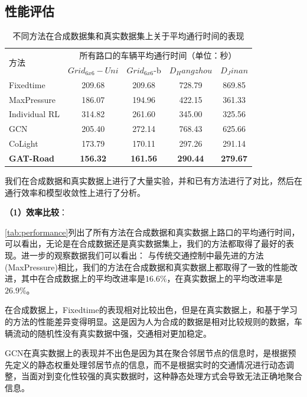 \subsection{性能评估}

\begin{table}[htb]
  \caption{不同方法在合成数据集和真实数据集上关于平均通行时间的表现}
  \label{tab:performance}
  \begin{tabular}{lcccc}
  \toprule
  \multirow{2}{*}{方法} & \multicolumn{4}{c}{所有路口的车辆平均通行时间（单位：秒）} \\
  \cline{2-5}
  &\multicolumn{1}{c}{$Grid_{6x6}-Uni$} & \multicolumn{1}{c}{$Grid_{6x6}$-b} & \multicolumn{1}{c}{$D_Hangzhou$} & \multicolumn{1}{c}{$D_Jinan$}\\
  \hline
  Fixedtime & 209.68 & 209.68 & 728.79 & 869.85 \\
  MaxPressure & 186.07 & 194.96 &  422.15 & 361.33 \\
  \hline
  Individual RL & 314.82 & 261.60 & 345.00 & 325.56 \\
  GCN & 205.40 & 272.14 & 768.43 & 625.66 \\
  CoLight & 173.79 & 170.11 & 297.26 & 291.14 \\
  \hline
  \textbf{GAT-Road} & \textbf{156.32} & \textbf{161.56} & \textbf{290.44} & \textbf{279.67} \\
  \bottomrule
  \end{tabular}
\end{table}
我们在合成数据和真实数据上进行了大量实验，并和已有方法进行了对比，然后在通行效率和模型收敛性上进行了分析。

\textbf{（1）效率比较}：

\autoref{tab:performance}列出了所有方法在合成数据和真实数据上路口的平均通行时间，可以看出，无论是在合成数据还是真实数据集上，我们的方法都取得了最好的表现。进一步的观察数据我们可以看出：
与传统交通控制中最先进的方法(MaxPressure)相比，我们的方法在合成数据和真实数据上都取得了一致的性能改进，其中在合成数据上的平均改进率是$16.6\%$，在真实数据上的平均改进率是$26.9\%$。

在合成数据上，Fixedtime的表现相对比较出色，但是在真实数据上，和基于学习的方法的性能差异变得明显。这是因为人为合成的数据是相对比较规则的数据，车辆流动的随机性没有真实数据中强，交通相对更加稳定。

GCN在真实数据上的表现并不出色是因为其在聚合邻居节点的信息时，是根据预先定义的静态权重处理邻居节点的信息，而不是根据实时的交通情况进行动态调整，当面对到变化性较强的真实数据时，这种静态处理方式会导致无法正确地聚合信息。

